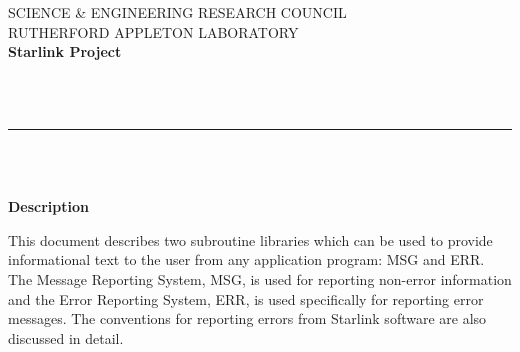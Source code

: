\newcommand{\sstbugs}[1]{\item[Bugs:] #1}

\newcommand{\sstitemlist}[1]{
  \mbox{} \\
  \vspace{-3.5ex}
  \begin{itemize}
     #1
  \end{itemize}
}

\newcommand{\sstitem}{\item}





\thispagestyle{empty}
SCIENCE \& ENGINEERING RESEARCH COUNCIL \hfill \stardocname\\
RUTHERFORD APPLETON LABORATORY\\
{\large\bf Starlink Project\\}
{\large\bf \stardoccategory\ \stardocnumber}
\begin{flushright}
\stardocauthors\\
\stardocdate
\end{flushright}
\vspace{-4mm}
\rule{\textwidth}{0.5mm}
\vspace{5mm}
\begin{center}
{\Huge\bf  \stardoctitle \\ [2.5ex]}
{\LARGE\bf \stardocversion \\ [4ex]}
{\Huge\bf  \stardocmanual}
\end{center}
\vspace{20mm}

\begin{center}
{\Large\bf Description}
\end{center}

This document describes two subroutine libraries which can be used to provide
informational text to the user from any application program: MSG and ERR.
The Message Reporting System, MSG, is used for reporting non-error information
and the Error Reporting System, ERR, is used specifically for reporting error
messages.
The conventions for reporting errors from Starlink software are also
discussed in detail.

